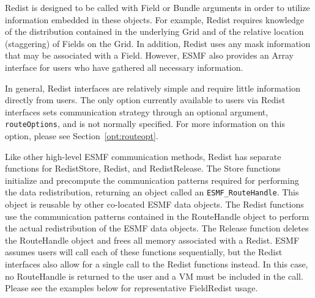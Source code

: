Redist is designed to be called with Field or Bundle arguments in order to
utilize information embedded in these objects.  For example, Redist requires
knowledge of the distribution contained in the underlying Grid and of the
relative location (staggering) of Fields on the Grid.  In addition, Redist uses
any mask information that may be associated with a Field.  However, ESMF also
provides an Array interface for users who have gathered all necessary
information.

In general, Redist interfaces are relatively simple and require little
information directly from users.  The only option currently available to users
via Redist interfaces sets communication strategy through an optional argument,
{\tt routeOptions}, and is not normally specified.  For more information on
this option, please see Section~\ref{opt:routeopt}.

Like other high-level ESMF communication methods, Redist has separate
functions for RedistStore, Redist, and RedistRelease.  The Store functions
initialize and precompute the communication patterns required for performing
the data redistribution, returning an object called an {\tt ESMF\_RouteHandle}.
This object is reusable by other co-located ESMF data objects.
The Redist functions use the communication patterns contained in the RouteHandle
object to perform the actual redistribution of the ESMF data objects.  The
Release function deletes the RouteHandle object and frees all memory associated
with a Redist.  ESMF assumes users will call each of these functions
sequentially, but the Redist interfaces also allow for a single call to the
Redist functions instead.  In this case, no RouteHandle is returned to the user
and a VM must be included in the call.  Please see the examples below for 
representative FieldRedist usage.



